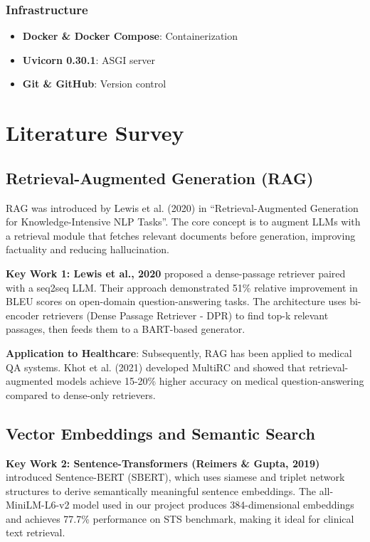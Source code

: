 \documentclass[12pt,singleside,a4paper]{article}
\begin{document}
\subsubsection{Infrastructure}
\begin{itemize}
\item \textbf{Docker \& Docker Compose}: Containerization
\item \textbf{Uvicorn 0.30.1}: ASGI server
\item \textbf{Git \& GitHub}: Version control
\end{itemize}

\pagebreak

\section{Literature Survey}

\subsection{Retrieval-Augmented Generation (RAG)}

RAG was introduced by Lewis et al. (2020) in ``Retrieval-Augmented Generation for Knowledge-Intensive NLP Tasks''. The core concept is to augment LLMs with a retrieval module that fetches relevant documents before generation, improving factuality and reducing hallucination.

\textbf{Key Work 1: Lewis et al., 2020}
\cite{lewis2020retrieval} proposed a dense-passage retriever paired with a seq2seq LLM. Their approach demonstrated 51\% relative improvement in BLEU scores on open-domain question-answering tasks. The architecture uses bi-encoder retrievers (Dense Passage Retriever - DPR) to find top-k relevant passages, then feeds them to a BART-based generator.

\textbf{Application to Healthcare}: Subsequently, RAG has been applied to medical QA systems. Khot et al. (2021) developed MultiRC and showed that retrieval-augmented models achieve 15-20\% higher accuracy on medical question-answering compared to dense-only retrievers.

\subsection{Vector Embeddings and Semantic Search}

\textbf{Key Work 2: Sentence-Transformers (Reimers \& Gupta, 2019)}
\cite{reimers2019sentence} introduced Sentence-BERT (SBERT), which uses siamese and triplet network structures to derive semantically meaningful sentence embeddings. The all-MiniLM-L6-v2 model used in our project produces 384-dimensional embeddings and achieves 77.7\% performance on STS benchmark, making it ideal for clinical text retrieval.
\end{document}
